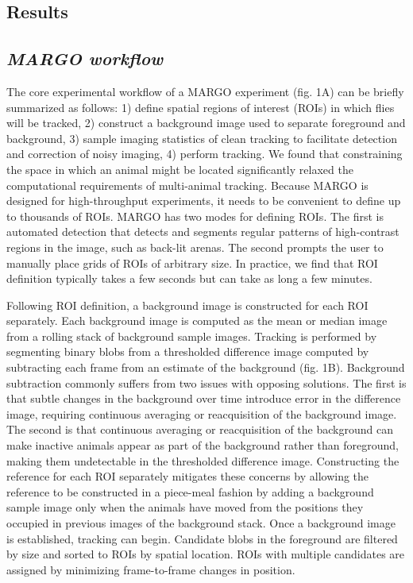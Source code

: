 \documentclass[10pt]{article}
\begin{document}
\begin{multicols}{2}
\section*{Results}

\subsection*{\textit{MARGO workflow}}

The core experimental workflow of a MARGO experiment (fig. 1A) can be briefly summarized as follows: 1) define spatial regions of interest (ROIs) in which flies will be tracked, 2) construct a background image used to separate foreground and background, 3) sample imaging statistics of clean tracking to facilitate detection and correction of noisy imaging, 4) perform tracking. We found that constraining the space in which an animal might be located significantly relaxed the computational requirements of multi-animal tracking. Because MARGO is designed for high-throughput experiments, it needs to be convenient to define up to thousands of ROIs. MARGO has two modes for defining ROIs. The first is automated detection that detects and segments regular patterns of high-contrast regions in the image, such as back-lit arenas. The second prompts the user to manually place grids of ROIs of arbitrary size. In practice, we find that ROI definition typically takes a few seconds but can take as long a few minutes.

Following ROI definition, a background image is constructed for each ROI separately. Each background image is computed as the mean or median image from a rolling stack of background sample images. Tracking is performed by segmenting binary blobs from a thresholded difference image computed by subtracting each frame from an estimate of the background (fig. 1B). Background subtraction commonly suffers from two issues with opposing solutions. The first is that subtle changes in the background over time introduce error in the difference image, requiring continuous averaging or reacquisition of the background image. The second is that continuous averaging or reacquisition of the background can make inactive animals appear as part of the background rather than foreground, making them undetectable in the thresholded difference image. Constructing the reference for each ROI separately mitigates these concerns by allowing the reference to be constructed in a piece-meal fashion by adding a background sample image only when the animals have moved from the positions they occupied in previous images of the background stack. Once a background image is established, tracking can begin. Candidate blobs in the foreground are filtered by size and sorted to ROIs by spatial location. ROIs with multiple candidates are assigned by minimizing frame-to-frame changes in position.


\end{multicols}
\end{document}
